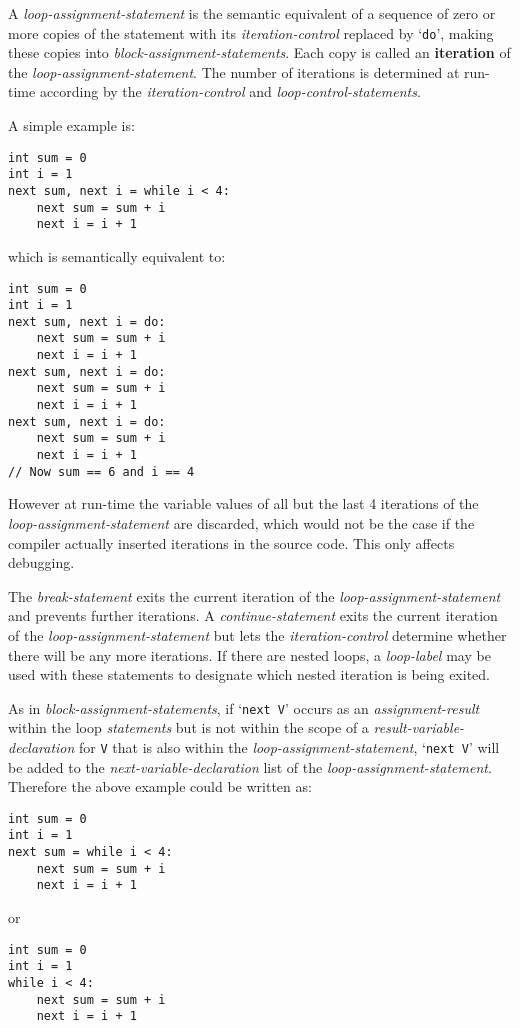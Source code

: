 \documentclass[12pt]{article}
\newcommand{\key}[1]{{\rm \bfseries #1}}
\newenvironment{indpar}[1][0.3in]%
	{\begin{list}{}%
		     {\setlength{\itemsep}{0in}%
		      \setlength{\topsep}{0in}%
		      \setlength{\parsep}{1ex}%
		      \setlength{\labelwidth}{#1}%
		      \setlength{\leftmargin}{#1}%
		      \addtolength{\leftmargin}{\labelsep}}%
	 \item}%
	{\end{list}}
\begin{document}
A {\em loop-assignment-statement} is the semantic equivalent of
a sequence of zero or more copies of the statement with
its {\em iteration-control} replaced by `{\tt do}', making these copies into
{\em block-assignment-statements}.  Each copy is called an
\key{iteration} of the {\em loop-assignment-statement}.
The number of iterations is
determined at run-time according by the {\em iteration-control}
and {\em loop-control-statements}.

A simple example is:
\begin{indpar}\begin{verbatim}
int sum = 0
int i = 1
next sum, next i = while i < 4:
    next sum = sum + i
    next i = i + 1
\end{verbatim}\end{indpar}
which is semantically equivalent to:
\begin{indpar}\begin{verbatim}
int sum = 0
int i = 1
next sum, next i = do:
    next sum = sum + i
    next i = i + 1
next sum, next i = do:
    next sum = sum + i
    next i = i + 1
next sum, next i = do:
    next sum = sum + i
    next i = i + 1
// Now sum == 6 and i == 4
\end{verbatim}\end{indpar}

However at run-time the variable values of all but the
last 4 iterations of the {\em loop-assignment-statement}
are discarded, which would not be the case if the compiler
actually inserted iterations in the source code. 
This only affects debugging.

The {\em break-statement} exits the current iteration of the
{\em loop-assignment-statement} and prevents further iterations.
A {\em continue-statement} exits the current iteration of the
{\em loop-assignment-statement} but lets the
{\em iteration-control} determine whether there will be any
more iterations.  If there are nested loops, a {\em loop-label}
may be used with these statements to designate which nested iteration
is being exited.

\label{LOOP-NEXT-PROMOTION}
As in {\em block-assignment-statements}, if `{\tt next V}' occurs
as an {\em assignment-result} within the loop {\em statements}
but is not within the scope of a {\em result-variable-declaration}
for {\tt V} that is also within the {\em loop-assignment-statement},
`{\tt next V}' will be added to the {\em next-variable-declaration}
list of the {\em loop-assignment-statement}.  Therefore the
above example could be written as:
\begin{indpar}\begin{verbatim}
int sum = 0
int i = 1
next sum = while i < 4:
    next sum = sum + i
    next i = i + 1
\end{verbatim}\end{indpar}
or
\begin{indpar}\begin{verbatim}
int sum = 0
int i = 1
while i < 4:
    next sum = sum + i
    next i = i + 1
\end{verbatim}\end{indpar}
\end{document}
